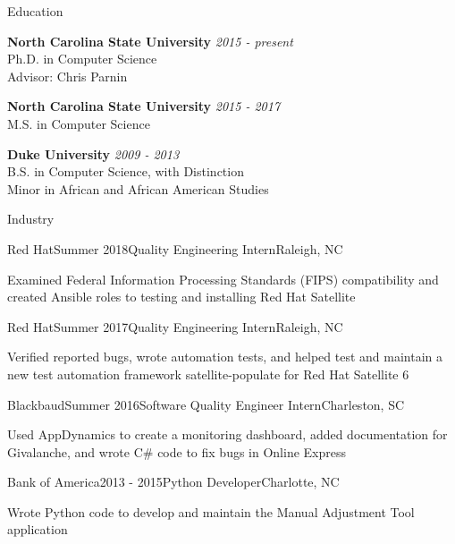 \documentclass{resume} %
\begin{document}

\begin{rSection}{Education}

{\bf North Carolina State University} \hfill {\em 2015 - present} \\ 
Ph.D. in Computer Science \\
Advisor: Chris Parnin

{\bf North Carolina State University} \hfill {\em 2015 - 2017} \\ 
M.S. in Computer Science

{\bf Duke University} \hfill {\em 2009 - 2013} \\ 
B.S. in Computer Science, with Distinction \\
Minor in African and African American Studies \\
\end{rSection}


\begin{rSection}{Industry}

\begin{rSubsection}{Red Hat}{Summer 2018}{Quality Engineering Intern}{Raleigh, NC}
\item Examined Federal Information Processing Standards (FIPS) compatibility and created Ansible roles to testing and installing Red Hat Satellite
\end{rSubsection}

\begin{rSubsection}{Red Hat}{Summer 2017}{Quality Engineering Intern}{Raleigh, NC}
\item Verified reported bugs, wrote automation tests, and helped test and maintain a new test automation framework satellite-populate for Red Hat Satellite 6
\end{rSubsection}

\begin{rSubsection}{Blackbaud}{Summer 2016}{Software Quality Engineer Intern}{Charleston, SC}
\item Used AppDynamics to create a monitoring dashboard, added documentation for Givalanche, and wrote C\# code to fix bugs in Online Express
\end{rSubsection}


\begin{rSubsection}{Bank of America}{2013 - 2015}{Python Developer}{Charlotte, NC}
\item  Wrote Python code to develop and maintain the Manual Adjustment Tool application
\end{rSubsection}

\end{rSection}
\end{document}
